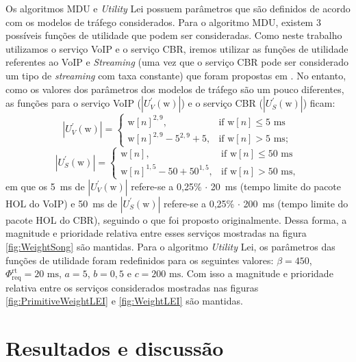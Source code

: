 Os algoritmos MDU e \textit{Utility} Lei possuem parâmetros que são definidos de acordo com os modelos de tráfego considerados. Para o algoritmo MDU, existem 3 possíveis funções de utilidade que podem ser consideradas. Como neste trabalho utilizamos o serviço VoIP e o serviço CBR, iremos utilizar as funções de utilidade referentes ao VoIP e \textit{Streaming} (uma vez que o serviço CBR pode ser considerado um tipo de \textit{streaming} com taxa constante) que foram propostas em . No entanto, como os valores dos parâmetros dos modelos de tráfego são um pouco diferentes, as funções para o serviço VoIP ($ |U^{'}_V(\text{w})|$) e o serviço CBR ($|U^{'}_S(\text{w})|$) ficam:
%
\begin{equation}
\label{Eq:VoIPAlt}
\left| U^{'}_V(\text{w}) \right| = \begin{cases} 
\text{w}[n]^{2,9}, & \text{if  } \text{w}[n] \leq \text{5 ms} \\ 
\text{w}[n]^{2,9} - 5^{2,9} + 5, & \text{if  } \text{w}[n] >  \text{5 ms}; 
\end{cases}
\end{equation} 
%
\begin{equation}
\label{Eq:StreamingAtl}
\left| U^{'}_S(\text{w}) \right| = \begin{cases} 
\text{w}[n], & \text{if  } \text{w}[n] \leq \text{50 ms} \\ 
\text{w}[n]^{1,5} - 50 + 50^{1,5}, & \text{if  } \text{w}[n] >  \text{50 ms},
\end{cases}
\end{equation}
%
em que os 5~ms de $ |U^{'}_V(\text{w})|$ refere-se a 0,25\% $\cdot$ 20~ms (tempo limite do pacote HOL do VoIP) e 50~ms de $|U^{'}_S(\text{w})|$ refere-se a 0,25\% $\cdot$ 200~ms (tempo limite do pacote HOL do CBR), seguindo o que foi proposto originalmente. Dessa forma, a magnitude e prioridade relativa entre esses serviços mostradas na figura \ref{fig:WeightSong} são mantidas.
Para o algoritmo \textit{Utility} Lei, os parâmetros das funções de utilidade foram redefinidos para os seguintes valores: $\beta = 450$, $\Phi_{\text{req}}^{\text{rt}} = 20 \text{ ms}$, $a = 5$, $b = 0,5$ e $c = 200 \text{ ms}$. Com isso a magnitude e prioridade relativa entre os serviços considerados mostradas nas figuras \ref{fig:PrimitiveWeightLEI} e \ref{fig:WeightLEI} são mantidas.

\section{Resultados e discussão}

